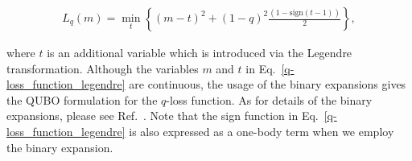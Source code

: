 \documentclass[fp,twocolumn]{jpsj3}
\begin{document}
\begin{eqnarray}
  L_{q}(m)=\min_{t}{\left\{(m-t)^{2}+(1-q)^{2}\frac{(1-\text{sign}(t-1))}{2}\right\}}, \label{q-loss_function_legendre}
\end{eqnarray}

where $t$ is an additional variable which is introduced via the Legendre transformation.
Although the variables $m$ and $t$ in Eq.~\eqref{q-loss_function_legendre} are continuous, the usage of the binary expansions gives the QUBO formulation for the $q$-loss function.
As for details of the binary expansions, please see Ref.~.
Note that the sign function in Eq.~\eqref{q-loss_function_legendre} is also expressed as a one-body term when we employ the binary expansion.


\end{document}
